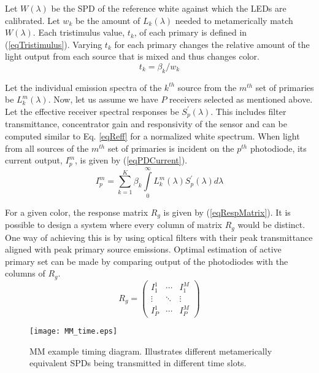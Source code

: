 Let $W(\lambda)$ be the SPD of the reference white against which the LEDs are calibrated. Let $w_{k}$ be the amount of $L_{k}(\lambda)$ needed to metamerically match $W(\lambda)$. Each tristimulus value, $t_{k}$, of each primary is defined in (\ref{eqTristimulus}). Varying $t_{k}$ for each primary changes the relative amount of the light output from each source that is mixed and thus changes color.
\begin{equation}
	\label{eqTristimulus}
	t_{k} = \beta_{k}/ w_{k}
\end{equation}

Let the individual emission spectra of the $k^{th}$ source from the $m^{th}$ set of primaries be  $L_{k}^{m}(\lambda)$. Now, let us assume we have $P$ receivers selected as mentioned above. Let the effective receiver spectral responses be $S_{p}^{'}(\lambda)$. This includes filter transmittance, concentrator gain and responsivity of the sensor and can be computed similar to Eq. \eqref{eqReff} for a normalized white spectrum. When light from all sources of the $m^{th}$ set of primaries is incident on the $p^{th}$ photodiode, its current output, $I_{p}^{m}$, is given by (\ref{eqPDCurrent}). 
\begin{equation}
	\label{eqPDCurrent}
	I_{p}^{m} = \sum\limits_{k=1}^{K} \beta_{k}\int\limits_{0}^{\infty} L_{k}^{m}(\lambda)S_{p}^{'}(\lambda)d\lambda
\end{equation}

For a given color, the response matrix $R_{g}$ is given by (\ref{eqRespMatrix}). It is possible to design a system where every column of matrix $R_{g}$ would be distinct. One way of achieving this is by using optical filters with their peak transmittance aligned with peak primary source emissions. Optimal estimation of active primary set can be made by comparing output of the photodiodes with the columns of $R_{g}$.
\begin{equation}
	\label{eqRespMatrix}
R_{g} = \left( \begin{array}{ccc}
I_{1}^{1}&\cdots&I_{1}^{M}\\
\vdots&\ddots&\vdots\\
I_{P}^{1}&\cdots&I_{P}^{M}
\end{array} \right)
\end{equation}

\begin{figure}[!b]
	\centering
    \texttt{[image: MM\_time.eps]}
	\caption[MM example timing diagram]{MM example timing diagram. Illustrates different metamerically equivalent SPDs being transmitted in different time slots.}
	\label{figMMex}
\end{figure}

